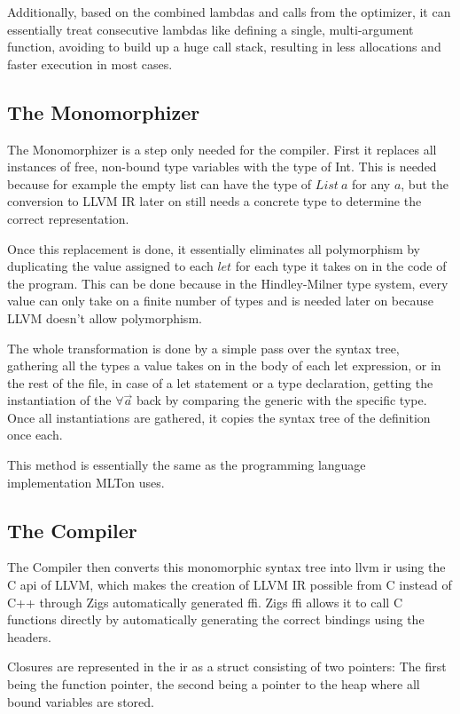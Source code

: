 \documentclass[12pt]{article}
\begin{document}
Additionally, based on the combined lambdas and calls from the optimizer, it can
essentially treat consecutive lambdas like defining a single, multi-argument
function, avoiding to build up a huge call stack, resulting in less allocations
and faster execution in most cases.

\subsection{The Monomorphizer}
The Monomorphizer is a step only needed for the compiler.
First it replaces all instances of free, non-bound type variables
with the type of Int. This is needed because for example the empty list
can have the type of $List\:a$ for any $a$, but the conversion to LLVM IR later on still needs a concrete
type to determine the correct representation.

Once this replacement is done, it essentially eliminates all polymorphism by duplicating
the value assigned to each $let$ for each type it takes on
in the code of the program. This can be done because
in the Hindley-Milner type system, every value
can only take on a finite number of types and is needed later on
because LLVM doesn't allow polymorphism.

The whole transformation is done by a simple pass over the syntax tree, gathering
all the types a value takes on in the body of each let expression,
or in the rest of the file, in case of a let statement or a type declaration,
getting the instantiation of the $\forall\vec{a}$ back by comparing the generic
with the specific type.
Once all instantiations are gathered, it copies the syntax tree of the definition once each.

This method is essentially the same as the programming language implementation MLTon uses.\autocite{Monomorphise}

\subsection{The Compiler}
The Compiler then converts this
monomorphic syntax tree into \Gls{llvm} \Gls{ir} using the C \Gls{api} of LLVM, which
makes the creation of LLVM IR possible from C instead of C++ through
Zigs automatically generated \Gls{ffi}. Zigs \Gls{ffi} allows it to call
C functions directly by automatically generating the correct bindings using the
headers.

Closures are represented in the \Gls{ir} as a struct consisting of two pointers:
The first being the function pointer, the second being a pointer to the heap
where all bound variables are stored.
\end{document}
